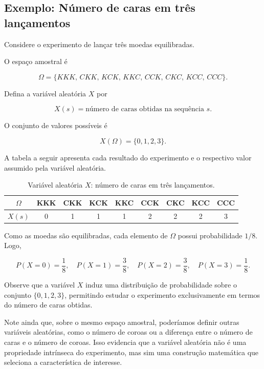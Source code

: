 \subsection{Exemplo: Número de caras em três lançamentos}

Considere o experimento de lançar três moedas equilibradas. \vskip0.3cm

O espaço amostral é

\[
\Omega=\{KKK,\,CKK,\,KCK,\,KKC,\,CCK,\,CKC,\,KCC,\,CCC\}.
\]

Defina a variável aleatória $X$ por

\[
X(s)=\text{número de caras obtidas na sequência } s.
\]

O conjunto de valores possíveis é

\[
X(\Omega)=\{0,1,2,3\}.
\]

A tabela a seguir apresenta cada resultado do experimento e o respectivo valor assumido pela variável aleatória.

\begin{table}[H]
\centering
\caption{Variável aleatória $X$: número de caras em três lançamentos.}
\begin{tabular}{c|cccccccc}
\hline\hline
$\Omega$ & KKK & CKK & KCK & KKC & CCK & CKC & KCC & CCC\\
\hline
$X(s)$ & 0 & 1 & 1 & 1 & 2 & 2 & 2 & 3\\
\hline\hline
\end{tabular}
\end{table}

Como as moedas são equilibradas, cada elemento de $\Omega$ possui probabilidade $1/8$. Logo,

\[
P(X=0)=\frac{1}{8}, \quad
P(X=1)=\frac{3}{8}, \quad
P(X=2)=\frac{3}{8}, \quad
P(X=3)=\frac{1}{8}.
\]

Observe que a variável $X$ induz uma distribuição de probabilidade sobre o conjunto $\{0,1,2,3\}$, permitindo estudar o experimento exclusivamente em termos do número de caras obtidas. \vskip0.3cm

Note ainda que, sobre o mesmo espaço amostral, poderíamos definir outras variáveis aleatórias, como o número de coroas ou a diferença entre o número de caras e o número de coroas. Isso evidencia que a variável aleatória não é uma propriedade intrínseca do experimento, mas sim uma construção matemática que seleciona a característica de interesse.



